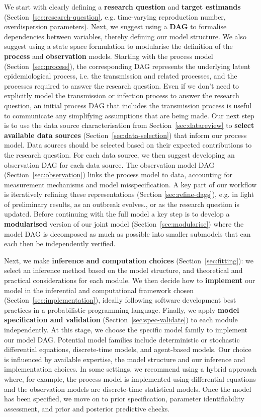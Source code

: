 \documentclass{article}
\begin{document}
We start with clearly defining a \textbf{research question} and \textbf{target estimands} (Section~\ref{sec:research-question}, e.g. time-varying reproduction number, overdispersion parameters). Next, we suggest using a \textbf{\ac{DAG}} to formalise dependencies between variables, thereby defining our model structure. We also suggest using a state space formulation \citep{birrell2018evidence} to modularise the definition of the \textbf{process} and \textbf{observation} models. Starting with the process model (Section~\ref{sec:process}), the corresponding \ac{DAG} represents the underlying latent epidemiological process, i.e. the transmission and related processes, and the processes required to answer the research question. Even if we don't need to explicitly model the transmission or infection process to answer the research question, an initial process \ac{DAG} that includes the transmission process is useful to communicate any simplifying assumptions that are being made.
Our next step is to use the data source characterisation from Section~\ref{sec:datareview} to \textbf{select available data sources} (Section~\ref{sec:data-selection}) that inform our process model. Data sources should be selected based on their expected contributions to the research question. For each data source, we then suggest developing an observation \ac{DAG} for each data source.
The observation model \ac{DAG} (Section~\ref{sec:observation}) links the process model to data, accounting for measurement mechanisms and model misspecification. A key part of our workflow is iteratively refining these representations (Section \ref{sec:refine-dags}), e.g. in light of preliminary results, as an outbreak evolves., or as the research question is updated.
Before continuing with the full model a key step is to develop a \textbf{modularised} version of our joint model (Section~\ref{sec:modularise}) where the model \ac{DAG} is decomposed as much as possible into smaller submodels that can each then be independently verified.

Next, we make \textbf{inference and computation choices} (Section~\ref{sec:fitting}): we select an inference method based on the model structure, and theoretical and practical considerations for each module.
We then decide how to \textbf{implement} our model in the inferential and computational framework chosen (Section~\ref{sec:implementation}), ideally following software development best practices in a probabilistic programming language.
Finally, we apply \textbf{model specification and validation} (Section~\ref{sec:spec-validate}) to each module independently. At this stage, we choose the specific model family to implement our model DAG. Potential model families include deterministic or stochastic differential equations, discrete-time models, and agent-based models.
Our choice is influenced by available expertise, the model structure and our inference and implementation choices. 
In some settings, we recommend using a hybrid approach where, for example, the process model is implemented using differential equations and the observation models are discrete-time statistical models.
Once the model has been specified, we move on to prior specification, parameter identifiability assessment, and prior and posterior predictive checks.
\end{document}
